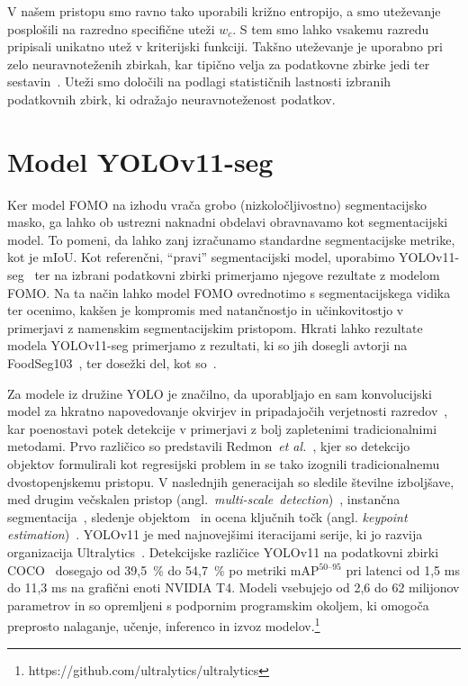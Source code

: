 \documentclass[a4paper,twoside,openright,12pt,slovene]{book}
\newcommand{\etal}{\textit{et al.}} %
\begin{document}
            V našem pristopu smo ravno tako uporabili križno entropijo, a smo uteževanje posplošili na razredno specifične uteži $w_c$. S tem smo lahko vsakemu razredu pripisali unikatno utež v kriterijski funkciji. Takšno uteževanje je uporabno pri zelo neuravnoteženih zbirkah, kar tipično velja za podatkovne zbirke jedi ter sestavin~\cite{src:wu2021large}. Uteži smo določili na podlagi statističnih lastnosti izbranih podatkovnih zbirk, ki odražajo neuravnoteženost podatkov.

    \section{Model YOLOv11-seg} \label{sct:metodologija-yolov11-seg}

        Ker model FOMO na izhodu vrača grobo (nizkoločljivostno) segmentacijsko masko, ga lahko ob ustrezni naknadni obdelavi obravnavamo kot segmentacijski model. To pomeni, da lahko zanj izračunamo standardne segmentacijske metrike, kot je mIoU.  Kot referenčni, “pravi” segmentacijski model, uporabimo YOLOv11-seg~\cite{src:yolov11} ter na izbrani podatkovni zbirki primerjamo njegove rezultate z modelom FOMO. Na ta način lahko model FOMO ovrednotimo s segmentacijskega vidika ter ocenimo, kakšen je kompromis med natančnostjo in učinkovitostjo v primerjavi z namenskim segmentacijskim pristopom.
        Hkrati lahko rezultate modela YOLOv11-seg primerjamo z rezultati, ki so jih dosegli avtorji na FoodSeg103~\cite{src:wu2021large}, ter dosežki del, kot so~\cite{src:chen2024ingredsam}.

        Za modele iz družine YOLO je značilno, da uporabljajo en sam konvolucijski model za hkratno napovedovanje okvirjev in pripadajočih verjetnosti razredov~\cite{src:du2018understanding}, kar poenostavi potek detekcije v primerjavi z bolj zapletenimi tradicionalnimi metodami.
        Prvo različico so predstavili Redmon~\etal~\cite{src:redmon2016you}, kjer so detekcijo objektov formulirali kot regresijski problem in se tako izognili tradicionalnemu dvostopenjskemu pristopu. V naslednjih generacijah so sledile številne izboljšave, med drugim večskalen pristop \mbox{(angl. \textit{multi-scale detection})~\cite{src:redmon2018yolov3}}, instančna segmentacija~\cite{src:yolov5}, sledenje objektom~\cite{src:yolov8} in ocena ključnih točk (angl. \textit{keypoint estimation})~\cite{src:wang2024yolov9}. YOLOv11 je med najnovejšimi iteracijami serije, ki jo razvija organizacija Ultralytics~\cite{src:ultralyticsyolov11, src:khanam2024yolov11, src:yolov11}.
        Detekcijske različice YOLOv11 na podatkovni zbirki COCO~\cite{src:lin2014microsoftcoco} dosegajo od 39{,}5~\% do 54{,}7~\% po metriki mAP$^{50\text{--}95}$ pri latenci od 1{,}5 ms do 11{,}3 ms na grafični enoti NVIDIA T4. Modeli vsebujejo od 2{,}6 do 62 milijonov parametrov in so opremljeni s podpornim programskim okoljem, ki omogoča preprosto nalaganje, učenje, inferenco in izvoz modelov.\footnote{https://github.com/ultralytics/ultralytics}
\end{document}
